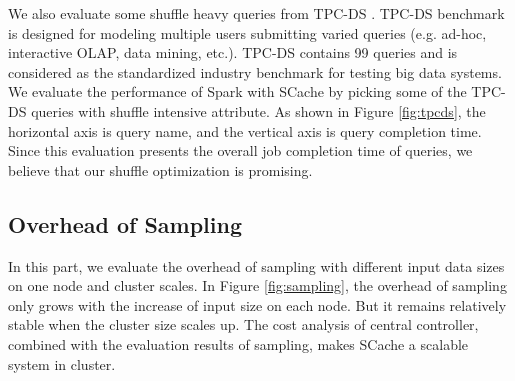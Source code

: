We also evaluate some shuffle heavy queries from TPC-DS \cite{tpcds}. 
TPC-DS benchmark is designed for modeling multiple users submitting varied queries (e.g. ad-hoc, interactive OLAP, data mining, etc.). 
TPC-DS contains 99 queries and is considered as the standardized industry benchmark for testing big data systems. 
We evaluate the performance of Spark with SCache by picking some of the TPC-DS queries with shuffle intensive attribute. 
As shown in Figure \ref{fig:tpcds}, the horizontal axis is query name, and the vertical axis is query completion time. 
Since this evaluation presents the overall job completion time of queries, we believe that our shuffle optimization is promising.
\subsection{Overhead of Sampling}

\ifrevision
{}
\fi
In this part, we evaluate the overhead of sampling with different input data sizes on one node and cluster scales. 
In Figure \ref{fig:sampling}, the overhead of sampling only grows with the increase of input size on each node. 
But it remains relatively stable when the cluster size scales up.
The cost analysis of central controller, combined with the evaluation results of sampling, makes SCache a scalable system in cluster.
